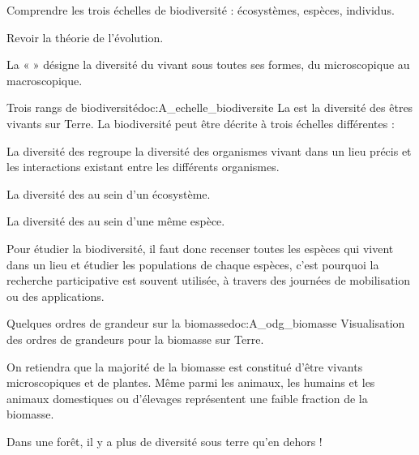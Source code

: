 \begin{multicols}{2}
\begin{objectifs}
  \item Comprendre les trois échelles de biodiversité : écosystèmes, espèces, individus.
  \item Revoir la théorie de l'évolution.
\end{objectifs}

\begin{contexte}
  La «  » désigne la diversité du vivant sous toutes ses formes, du microscopique au macroscopique.
  
\end{contexte}

\begin{doc}{Trois rangs de biodiversité}{doc:A_echelle_biodiversite}
  La  est la diversité des êtres vivants sur Terre. 
  La biodiversité peut être décrite à trois échelles différentes :
  \begin{listePoints}
    \item La diversité des  regroupe la diversité des organismes vivant dans un lieu précis et les interactions existant entre les différents organismes.
    \item La diversité des  au sein d'un écosystème.
    \item La diversité des  au sein d'une même espèce.
  \end{listePoints}

  Pour étudier la biodiversité, il faut donc recenser toutes les espèces qui vivent dans un lieu et étudier les populations de chaque espèces, c'est pourquoi la recherche participative est souvent utilisée, à travers des journées de mobilisation ou des applications.
\end{doc}

\begin{doc}{Quelques ordres de grandeur sur la biomasse}{doc:A_odg_biomasse}
  \textcolor{couleurPrim}{\faArrowLeft} Visualisation des ordres de grandeurs pour la biomasse sur Terre.

  On retiendra que la majorité de la biomasse est constitué d'être vivants microscopiques et de plantes.
  Même parmi les animaux, les humains et les animaux domestiques ou d'élevages représentent une faible fraction de la biomasse.
  
  Dans une forêt, il y a plus de diversité sous terre qu'en dehors !
\end{doc}

\end{multicols}

